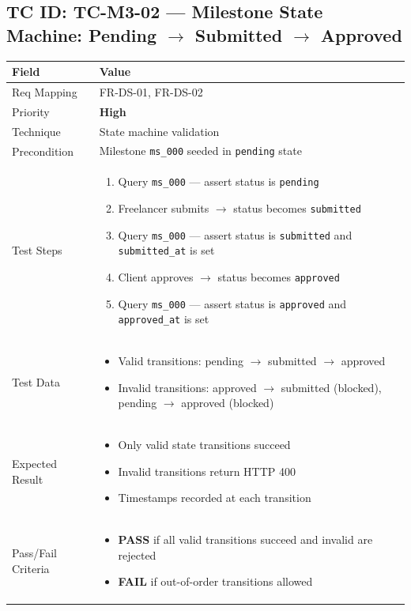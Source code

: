 \documentclass[12pt,a4paper]{article}
\newcommand{\sevhigh}{\textcolor{severityhigh}{\textbf{High}}}
\newcommand{\passresult}{\textcolor{passgreen}{\textbf{PASS}}}
\newcommand{\failresult}{\textcolor{failred}{\textbf{FAIL}}}
\begin{document}
\vspace{0.8cm}

\subsection{TC ID: TC-M3-02 --- Milestone State Machine: Pending $\rightarrow$ Submitted $\rightarrow$ Approved}

\begin{tabular}{|p{}|p{}|}
\hline
\rowcolor{lightblue} \textbf{Field} & \textbf{Value} \\
\hline
Req Mapping & FR-DS-01, FR-DS-02 \\
\hline
Priority & \sevhigh \\
\hline
Technique & State machine validation \\
\hline
Precondition & Milestone \texttt{ms\_000} seeded in \texttt{pending} state \\
\hline
Test Steps &
\begin{enumerate}[nosep, leftmargin=*]
  \item Query \texttt{ms\_000} --- assert status is \texttt{pending}
  \item Freelancer submits $\rightarrow$ status becomes \texttt{submitted}
  \item Query \texttt{ms\_000} --- assert status is \texttt{submitted} and \texttt{submitted\_at} is set
  \item Client approves $\rightarrow$ status becomes \texttt{approved}
  \item Query \texttt{ms\_000} --- assert status is \texttt{approved} and \texttt{approved\_at} is set
\end{enumerate} \\
\hline
Test Data &
\begin{itemize}[nosep, leftmargin=*]
  \item Valid transitions: pending $\rightarrow$ submitted $\rightarrow$ approved
  \item Invalid transitions: approved $\rightarrow$ submitted (blocked), pending $\rightarrow$ approved (blocked)
\end{itemize} \\
\hline
Expected Result &
\begin{itemize}[nosep, leftmargin=*]
  \item Only valid state transitions succeed
  \item Invalid transitions return HTTP 400
  \item Timestamps recorded at each transition
\end{itemize} \\
\hline
Pass/Fail Criteria &
\begin{itemize}[nosep, leftmargin=*]
  \item \passresult{} if all valid transitions succeed and invalid are rejected
  \item \failresult{} if out-of-order transitions allowed
\end{itemize} \\
\hline
\end{tabular}
\end{document}
